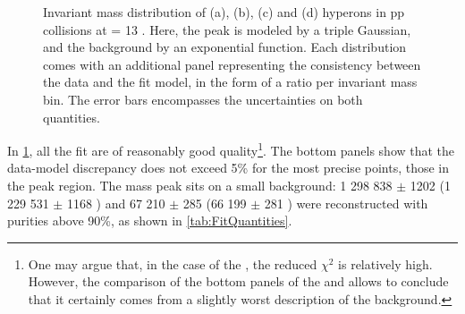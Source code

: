 \begin{figure}[p]
{	\label{fig:OmegaMinus_ModGaussian}
} 
\caption{Invariant mass distribution of \rmXiM (a), \rmAxiP (b), \rmOmegaM (c) and \rmAomegaP (d) hyperons in pp collisions at \sqrtS = 13 \tev. Here, the peak is modeled by a triple Gaussian, and the background by an exponential function. Each distribution comes with an additional panel representing the consistency between the data and the fit model, in the form of a ratio per invariant mass bin. The error bars encompasses the uncertainties on both quantities.}
	\label{fig:InvMassCascades}
\end{figure}

In \figs\ref{fig:InvMassCascades}, all the fit are of reasonably good quality\footnote{One may argue that, in the case of the \rmXiM, the reduced $\chi^{2}$  is relatively high. However, the comparison of the bottom panels of the \rmXiM and \rmAxiP allows to conclude that it certainly comes from a slightly worst description of the background.}. The bottom panels show that the data-model discrepancy does not exceed 5\% for the most precise points, \ie those in the peak region. The mass peak sits on a small background: 1 298 838 $\pm$ 1202 \rmXiM (1 229 531 $\pm$ 1168 \rmAxiP) and 67 210 $\pm$ 285 \rmOmegaM (66 199 $\pm$ 281 \rmAomegaP) were reconstructed with purities above 90\%, as shown in \tab\ref{tab:FitQuantities}.

